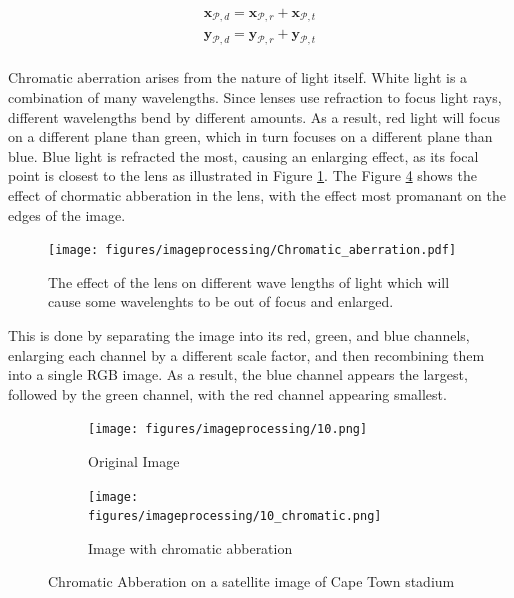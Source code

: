\begin{equation}
    \begin{split}
    \mathbf{x}_{\mathcal{P},d} = \mathbf{x}_{\mathcal{P},r}  + \mathbf{x}_{\mathcal{P},t}  \\
    \mathbf{y}_{\mathcal{P},d}  = \mathbf{y}_{\mathcal{P},r}  + \mathbf{y}_{\mathcal{P},t}  \\        
    \end{split}
    \label{Eq:Distortion}
\end{equation}


Chromatic aberration arises from the nature of light itself. White light is a combination of many wavelengths. Since lenses use refraction to focus light rays, 
different wavelengths bend by different amounts. As a result, red light will focus on a different plane than green, which in turn focuses on a different plane 
than blue. Blue light is refracted the most, causing an enlarging effect, as its focal point is closest to the lens as illustrated in Figure \ref{fig:Chroma}. The Figure \ref{fig:CA} shows the effect of chormatic abberation in the lens, with the effect most promanant on the edges of the image.
\vspace{0.5cm}

\begin{figure}[H]
    \centering
    \texttt{[image: figures/imageprocessing/Chromatic\_aberration.pdf]}
    \caption{The effect of the lens on different wave lengths of light which will cause some wavelenghts to be out of focus and enlarged. \cite{Chroma}}
    \label{fig:Chroma}
\end{figure}

\noindent
This is done by separating the image into its red, green, and blue channels, enlarging each channel by a different scale factor, and then 
recombining them into a single RGB image. As a result, the blue channel appears the largest, followed by the green channel, with the red channel appearing smallest.

\begin{figure}[H]
    \centering
    \begin{subfigure}[b]{0.48\linewidth}
        \centering
        \texttt{[image: figures/imageprocessing/10.png]}
        \caption{Original Image}
        \label{fig:CA1}
    \end{subfigure}
    \hfill
    \begin{subfigure}[b]{0.48\linewidth}
        \centering
        \texttt{[image: figures/imageprocessing/10\_chromatic.png]}
        \caption{Image with chromatic abberation}
        \label{fig:CA2}
    \end{subfigure}
    \caption{Chromatic Abberation on a satellite image of Cape Town stadium}
    \label{fig:CA}
\end{figure}

